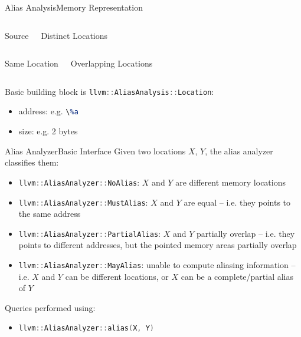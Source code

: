 \documentclass[10pt,mathserif]{beamer}
\newcommand{\cppinline}[1]{\lstinline[language=C++]!#1!}
\newcommand{\llvminput}[1]{}
\newcommand{\llvminline}[1]{\lstinline[language=LLVM]!#1!}
\begin{document}
\begin{frame}{Alias Analysis}{Memory Representation}
\begin{columns}[t]
\begin{block}{Source}
\centering
\llvminput{snippet/02/memory-locations.ll}
\end{block}

\begin{block}{Distinct Locations}
\centering

\end{block}
\end{columns}

\begin{columns}[t]
\begin{block}{Same Location}
\centering

\end{block}

\begin{block}{Overlapping Locations}
\centering

\end{block}
\end{columns}

\bigskip
Basic building block is \cppinline{llvm::AliasAnalysis::Location}:

\begin{itemize}
\item address: e.g. \llvminline{\%a}
\item size: e.g. 2 bytes
\end{itemize}
\end{frame}

\begin{frame}{Alias Analyzer}{Basic Interface}
Given two locations $X$, $Y$, the alias analyzer classifies them:

\begin{itemize}
\item \cppinline{llvm::AliasAnalyzer::NoAlias}: $X$ and $Y$ are different
      memory locations
\item \cppinline{llvm::AliasAnalyzer::MustAlias}: $X$ and $Y$ are equal -- i.e.
      they points to the same address
\item \cppinline{llvm::AliasAnalyzer::PartialAlias}: $X$ and $Y$ partially
      overlap -- i.e. they points to different addresses, but the pointed memory
      areas partially overlap
\item \cppinline{llvm::AliasAnalyzer::MayAlias}: unable to compute aliasing
      information -- i.e. $X$ and $Y$ can be different locations, or $X$ can be
      a complete/partial alias of $Y$
\end{itemize}

Queries performed using:

\begin{itemize}
\item \cppinline{llvm::AliasAnalyzer::alias(X, Y)}
\end{itemize}
\end{frame}
\end{document}
